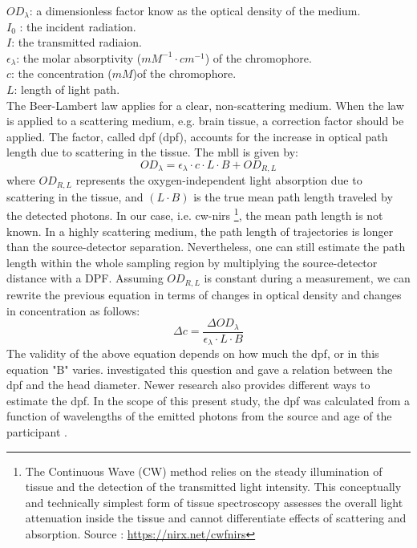 \noindent 
$OD_{\lambda} $: a dimensionless factor know as the optical density of the medium.  \\
$I_0$ : the incident radiation. \\
$I$: the transmitted radiaion. \\
$\epsilon _{\lambda}$: the molar absorptivity ($mM^{-1} \cdot cm^{-1}$) of the chromophore. \\
$c$: the concentration ($mM$)of the chromophore. \\
$L$: length of light path. \\

The Beer-Lambert law applies for a clear, non-scattering medium. When the law is applied to a scattering medium, e.g. brain tissue, a correction factor should be applied. The factor, called \acrlong{dpf} (\acrshort{dpf}), accounts for the increase in optical path length due to scattering in the tissue. The \acrlong{mbll} \citep {Delpy_1988} is given by:
\begin{equation} 
OD_{\lambda} = \epsilon _{\lambda} \cdot c \cdot L \cdot B + OD_{R,L}
\end{equation} 
where $OD_{R,L}$ represents the oxygen-independent light absorption due to scattering in the tissue, and $(L \cdot B)$ is the true mean path length traveled by the detected photons. In our case, i.e. \acrshort{cw-nirs} \footnote {The Continuous Wave (CW) method relies on the steady illumination of tissue and the detection of the transmitted light intensity.  This conceptually and technically simplest form of tissue spectroscopy assesses the overall  light attenuation inside the tissue and cannot differentiate effects of scattering and absorption. Source : \url{https://nirx.net/cwfnirs}}, the mean path length is not known. In a highly scattering medium, the path length of trajectories is longer than the source-detector separation. Nevertheless, one can still estimate the path length within the whole sampling region by multiplying the source-detector distance with a DPF. Assuming $OD_{R,L}$ is constant during a measurement, we can rewrite the previous equation in terms of changes in optical density and changes in concentration as follows:
\begin{equation} 
\Delta c =\frac { \Delta OD_{\lambda}} {\epsilon _{\lambda} \cdot L \cdot B}
\end{equation} 
The validity of the above equation depends on how much the \acrshort{dpf}, or in this equation "B" varies. \citep {Delpy_1988} investigated this question and gave a relation between the \acrshort{dpf} and the head diameter. Newer research also provides different ways to estimate the \acrshort{dpf}. In the scope of this present study, the \acrshort{dpf} was calculated from a function of wavelengths of the emitted photons from the source and age of the participant \citep {Duncan1996MeasurementOC}.



